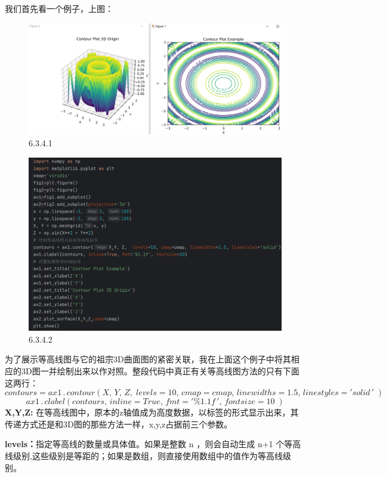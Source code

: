 \documentclass[12pt]{article}
\begin{document}
我们首先看一个例子，上图：

\begin{figure}[H]
    \centering
    \includegraphics[width=1\linewidth]{3D 等高线图 Pic1.png}
    \caption{6.3.4.1}
    \label{fig:enter-label}
\end{figure}
\begin{figure}[H]
    \centering
    \includegraphics[width=0.8\linewidth]{3D 等高线图 program1.png}
    \caption{6.3.4.2}
    \label{fig:enter-label}
\end{figure}
\newpage
为了展示等高线图与它的祖宗3D曲面图的紧密关联，我在上面这个例子中将其相应的3D图一并绘制出来以作对照。整段代码中真正有关等高线图方法的只有下面这两行：
\[contours = ax1\,.\,contour(X,\,Y,\, Z,\;  levels=10,\, cmap=cmap,\, linewidths=1.5,\, linestyles='solid\,'\;)\]
\[ax1\,.\,clabel(contours,\, inline=True,\, fmt='\%1.1f\,',\, fontsize=10\;)\]
\noindent\textbf{X,Y,Z: }在等高线图中，原本的z轴值成为高度数据，以标签的形式显示出来，其传递方式还是和3D图的那些方法一样，x,y,z占据前三个参数。

\noindent\textbf{ levels：}指定等高线的数量或具体值。如果是整数   n  ，则会自动生成   n+1   个等高线级别,这些级别是等距的；如果是数组，则直接使用数组中的值作为等高线级别。
\end{document}
